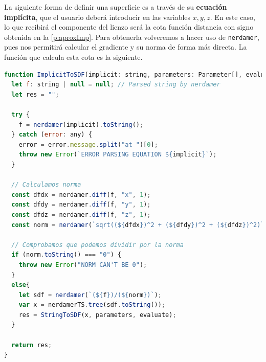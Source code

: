 La siguiente forma de definir una superficie es a través de su \textbf{ecuación implícita}, que el usuario deberá introducir en las variables $x,y,z$. En este caso, lo que recibirá el componente del lienzo será la cota función distancia con signo obtenida en la \autoref{p:aproxImp}. Para obtenerla volveremos a hacer uso de \texttt{nerdamer}, pues nos permitirá calcular el gradiente y su norma de forma más directa. La función que calcula esta cota es la siguiente.
\begin{lstlisting}[language=JavaScript, caption=Obtención de cota de ecuación implícita]
function ImplicitToSDF(implicit: string, parameters: Parameter[], evaluate: boolean = false) : string{
  let f: string | null = null; // Parsed string by nerdamer
  let res = "";

  try {
    f = nerdamer(implicit).toString();
  } catch (error: any) {
    error = error.message.split("at ")[0];
    throw new Error(`ERROR PARSING EQUATION ${implicit}`);
  }

  // Calculamos norma
  const dfdx = nerdamer.diff(f, "x", 1);
  const dfdy = nerdamer.diff(f, "y", 1);
  const dfdz = nerdamer.diff(f, "z", 1);
  const norm = nerdamer(`sqrt((${dfdx})^2 + (${dfdy})^2 + (${dfdz})^2)`);

  // Comprobamos que podemos dividir por la norma
  if (norm.toString() === "0") {
    throw new Error("NORM CAN'T BE 0");
  }
  else{
    let sdf = nerdamer(`(${f})/(${norm})`);
    var x = nerdamerTS.tree(sdf.toString());
    res = StringToSDF(x, parameters, evaluate);
  }

  return res;
}
\end{lstlisting}
